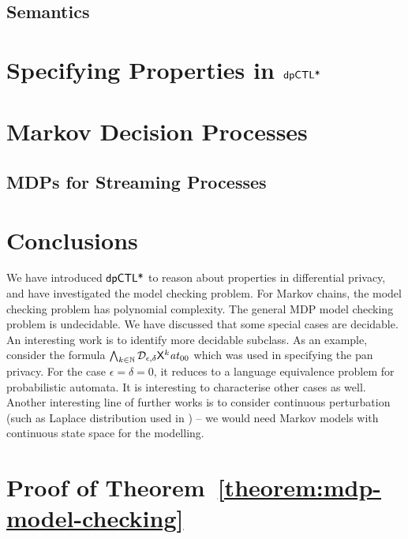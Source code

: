 \documentclass{llncs}
\begin{document}
\subsection{Semantics}
\label{subsection:semantics}


\section{Specifying Properties in $\textsf{dpCTL*}$}
\label{section:specifying-properties}


\section{Markov Decision Processes}
\label{section:mdp}


%


\subsection{MDPs for Streaming Processes}
\label{section:applications}


\section{Conclusions}
\label{section:conclusions}
We have introduced $\textsf{dpCTL*}$ to reason about properties in differential privacy, and have investigated the model checking problem. For Markov chains, the model checking problem has polynomial complexity. The general MDP model checking problem is undecidable. We have discussed that some special cases are decidable. An interesting work is to identify more
decidable subclass. As an example, consider the formula $\bigwedge_{k \in \mathbb{N}}
\mathcal{D}_{{\epsilon}, {\delta}} \mathsf{X}^k \mathit{at}_{00}$ which was used in specifying the pan privacy. For the case $\epsilon=\delta=0$, it reduces to a language equivalence problem for probabilistic automata. It is interesting to characterise other cases as well.
 Another interesting line of further works is to consider continuous perturbation (such as Laplace distribution used in \cite{DR:14:AFDP}) -- we would need Markov models with continuous state space for the modelling.





\appendix
\section{Proof of Theorem~\ref{theorem:mdp-model-checking}}

\end{document}
